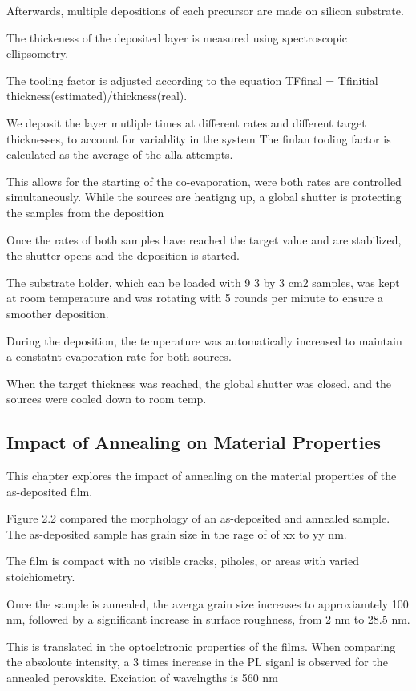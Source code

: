 Afterwards, multiple depositions of each precursor are made on silicon substrate. 

The thickeness of the deposited layer is measured using spectroscopic ellipsometry. 

The tooling factor is adjusted according to the equation TFfinal = Tfinitial thickness(estimated)/thickness(real). 

We deposit the layer mutliple times at different rates and different target thicknesses, to account for variablity in the system The finlan tooling factor is calculated as the average of the alla attempts. 

This allows for the starting of the co-evaporation, were both rates are controlled simultaneously. While the sources are heatigng up, a global shutter is protecting the samples from the deposition

Once the rates of both samples have reached the target value and are stabilized, the shutter opens and the deposition is started. 

The substrate holder, which can be loaded with 9 3 by 3 cm2 samples, was kept at room temperature and was rotating with 5 rounds per minute to ensure a smoother deposition. 

During the deposition, the temperature was automatically increased to maintain a constatnt evaporation rate for both sources. 

When the target thickness was reached, the global shutter was closed, and the sources were cooled down to room temp. 



\subsection{Impact of Annealing on Material Properties}

This chapter explores the impact of annealing on the material properties of the as-deposited film. 

Figure 2.2 compared the morphology of an as-deposited and annealed sample. The as-deposited sample has grain size in the rage of of xx to yy nm. 

The film is compact with no visible cracks, piholes, or areas with varied stoichiometry.

Once the sample is annealed, the averga grain size increases to approxiamtely 100 nm, followed by a significant increase in surface roughness, from 2 nm to 28.5 nm. 

This is translated in the optoelctronic properties of the films. When comparing the absoloute intensity, a 3 times increase in the PL siganl is observed for the annealed perovskite. Exciation of wavelngths is 560 nm

